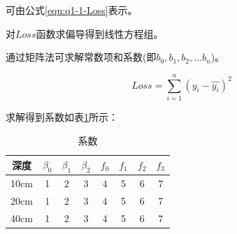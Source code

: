 \documentclass[12pt,a4paper,AutoFakeBold]{article} %
\begin{document}
				可由公式\eqref{equ:q1-1-Loss}表示。
				
				对$Loss$函数求偏导得到线性方程组。
				
				通过矩阵法可求解常数项和系数(即$b_{0},b_{1},b_{2},...b_{n}$)。

				\begin{equation}
					Loss = \sum_{i=1}^{n} (y_i-\widehat{y_i})^2 
					\label{equ:q1-1-Loss}
				\end{equation}

				求解得到系数如表\ref{tab:q1-humidity coefficient}所示：
				\begin{table}[!htbp]
					\caption{系数}%
					\centering         
					\begin{tabular}{cccccccc}
						\toprule[1.5pt]%
						深度 & $\beta _{0}$  &  $\beta _{1}$  &   $\beta _{2}$  &   $f_{0}$  &   $f_{1}$&   $f_{2}$&   $f_{3}$\\
						\midrule[1pt]%
						10cm&1&2&3&4&5&6&7\\
						20cm&1&2&3&4&5&6&7\\
						40cm&1&2&3&4&5&6&7\\
						\bottomrule[1.5pt]%
					\end{tabular}
					\label{tab:q1-humidity coefficient}%
				\end{table}

	\newpage
	
\end{document}
